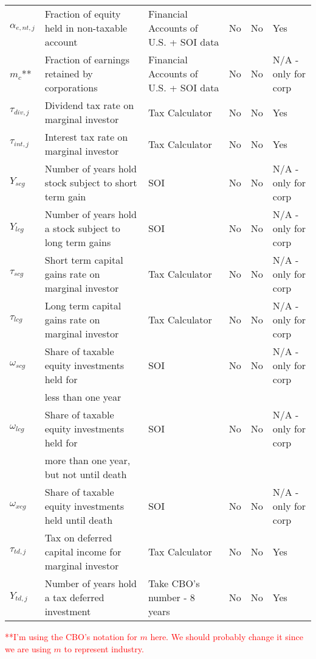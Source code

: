 \documentclass[article,11pt,letterpaper,fleqn]{article}
\theoremstyle{definition}
\numberwithin{equation}{section}
\begin{document}
\begin{landscape}
\begin{table}[htbp]
\begin{tabular}{llllll}
    $\alpha_{e,nt,j}$ & Fraction of equity held in non-taxable account & Financial Accounts of U.S. + SOI data & No    & No    & Yes \\
    $m_{c}$** & Fraction of earnings retained by corporations & Financial Accounts of U.S. + SOI data & No    & No    & N/A - only for corp \\
    $\tau_{div,j}$ & Dividend tax rate on marginal investor & Tax Calculator & No    & No    & Yes \\
    $\tau_{int,j}$ & Interest tax rate on marginal investor & Tax Calculator & No    & No    & Yes \\
    $Y_{scg}$ & Number of years hold stock subject to short term gain & SOI   & No    & No    & N/A - only for corp \\
    $Y_{lcg}$ & Number of years hold a stock subject to long term gains & SOI   & No    & No    & N/A - only for corp \\
    $\tau_{scg}$ & Short term capital gains rate on marginal investor & Tax Calculator & No    & No    & N/A - only for corp \\
    $\tau_{lcg}$ & Long term capital gains rate on marginal investor & Tax Calculator & No    & No    & N/A - only for corp \\
    $\omega_{scg}$ & Share of taxable equity investments held for & SOI   & No    & No    & N/A - only for corp \\
    & less than one year  & & & & \\
    $\omega_{lcg}$ & Share of taxable equity investments held for  & SOI   & No    & No    & N/A - only for corp \\
    & more than one year, but not until death & & & & \\
    $\omega_{xcg}$ & Share of taxable equity investments held until death & SOI   & No    & No    & N/A - only for corp \\
    $\tau_{td,j}$ & Tax on deferred capital income for marginal investor & Tax Calculator & No    & No    & Yes \\
    $Y_{td,j}$ & Number of years hold a tax deferred investment & Take CBO's number - 8 years & No    & No    & Yes \\
    \hline
    \hline
    \end{tabular}%
  \label{tab:param_list}%
  \vspace{1ex}
     \raggedright{\textcolor{red}{**I'm using the CBO's notation for $m$ here.  We should probably change it since we are using $m$ to represent industry.}}
\end{table}%
\end{landscape}
\end{document}
